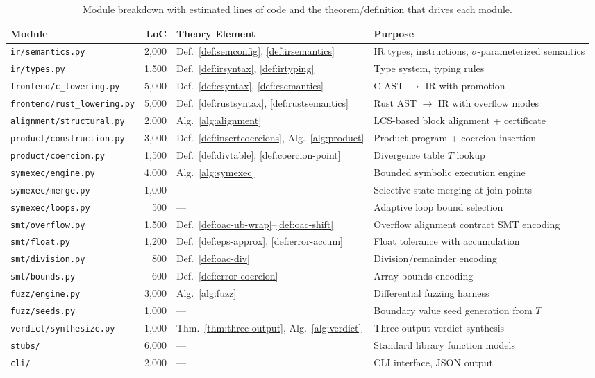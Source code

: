 \documentclass[11pt]{article}
\newcommand{\SemConfig}{\sigma}
\begin{document}
\begin{table}[H]
\centering
\caption{Module breakdown with estimated lines of code and the theorem/definition that drives each module.}
\label{tab:modules}
\begin{tabular}{@{}lrlp{5cm}@{}}
\toprule
Module & LoC & Theory Element & Purpose \\
\midrule
\texttt{ir/semantics.py} & 2,000 & Def.~\ref{def:semconfig}, \ref{def:irsemantics} & IR types, instructions, $\SemConfig$-parameterized semantics \\
\texttt{ir/types.py} & 1,500 & Def.~\ref{def:irsyntax}, \ref{def:irtyping} & Type system, typing rules \\
\texttt{frontend/c\_lowering.py} & 5,000 & Def.~\ref{def:csyntax}, \ref{def:csemantics} & C AST $\to$ IR with promotion \\
\texttt{frontend/rust\_lowering.py} & 5,000 & Def.~\ref{def:rustsyntax}, \ref{def:rustsemantics} & Rust AST $\to$ IR with overflow modes \\
\texttt{alignment/structural.py} & 2,000 & Alg.~\ref{alg:alignment} & LCS-based block alignment + certificate \\
\texttt{product/construction.py} & 3,000 & Def.~\ref{def:insertcoercions}, Alg.~\ref{alg:product} & Product program + coercion insertion \\
\texttt{product/coercion.py} & 1,500 & Def.~\ref{def:divtable}, \ref{def:coercion-point} & Divergence table $T$ lookup \\
\texttt{symexec/engine.py} & 4,000 & Alg.~\ref{alg:symexec} & Bounded symbolic execution engine \\
\texttt{symexec/merge.py} & 1,000 & --- & Selective state merging at join points \\
\texttt{symexec/loops.py} & 500 & --- & Adaptive loop bound selection \\
\texttt{smt/overflow.py} & 1,500 & Def.~\ref{def:oac-ub-wrap}--\ref{def:oac-shift} & Overflow alignment contract SMT encoding \\
\texttt{smt/float.py} & 1,200 & Def.~\ref{def:eps-approx}, \ref{def:error-accum} & Float tolerance with accumulation \\
\texttt{smt/division.py} & 800 & Def.~\ref{def:oac-div} & Division/remainder encoding \\
\texttt{smt/bounds.py} & 600 & Def.~\ref{def:error-coercion} & Array bounds encoding \\
\texttt{fuzz/engine.py} & 3,000 & Alg.~\ref{alg:fuzz} & Differential fuzzing harness \\
\texttt{fuzz/seeds.py} & 1,000 & --- & Boundary value seed generation from $T$ \\
\texttt{verdict/synthesize.py} & 1,000 & Thm.~\ref{thm:three-output}, Alg.~\ref{alg:verdict} & Three-output verdict synthesis \\
\texttt{stubs/} & 6,000 & --- & Standard library function models \\
\texttt{cli/} & 2,000 & --- & CLI interface, JSON output \\
\bottomrule
\end{tabular}
\end{table}
\end{document}
